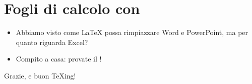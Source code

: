 \documentclass{beamer}
\begin{document}
\section{Fogli di calcolo con \protect{}}

\begin{frame}[fragile]{\insertsection}
\begin{itemize}
\item Abbiamo visto come \LaTeX{} possa rimpiazzare Word e PowerPoint, ma per quanto riguarda Excel?
\item Compito a casa: provate il !
\end{itemize}
\end{frame}

\begin{frame}
\begin{center}
Grazie, e buon \TeX{}ing!
\end{center}
\end{frame}
\end{document}
